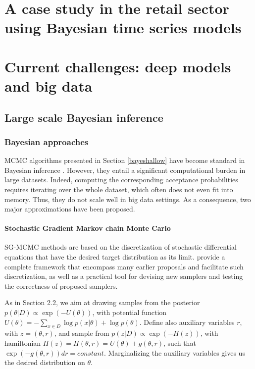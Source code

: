 \section{A case study in the retail sector using Bayesian time series models}\label{sec:dlms}


\section{Current challenges: deep models and big data}


\subsection{Large scale Bayesian inference}

\subsubsection{Bayesian approaches}

MCMC algorithms presented in Section \ref{bayeshallow}
have become standard in Bayesian inference \cite{french}.
However, they entail a significant computational burden in large datasets. Indeed, 
computing the corresponding acceptance probabilities 
 requires iterating over the whole dataset, which often does not even
 fit into memory. Thus, they 
  do not scale well in big data settings. 
 As a consequence, two major approximations have been proposed.

\paragraph{Stochastic Gradient Markov chain Monte Carlo}\label{bayesdeep} 

SG-MCMC methods are based on the discretization of 
stochastic differential equations that have the desired target 
distribution as its limit. \cite{ma2015complete} provide a
complete framework that encompass many earlier proposals and
facilitate such discretization, as well as a practical tool for
devising new samplers and testing the correctness of proposed samplers.

As in Section 2.2, we aim at drawing samples from the
posterior $p(\theta |D) \propto \exp(-U(\theta ))$,
with potential function
$U(\theta ) = -\sum _{x\in D} \log p(x|\theta ) + \log p(\theta )$. Define also auxiliary variables $r$,
with $z=( \theta, r )$, and sample from $p(z|D) \propto  \exp(-H(z))$, with hamiltonian
$H(z) = H(\theta , r) = U(\theta ) + g(\theta , r)$, such that
$\exp(-g(\theta , r))dr = constant$. 
Marginalizing the auxiliary variables gives us the desired distribution on $\theta $.

